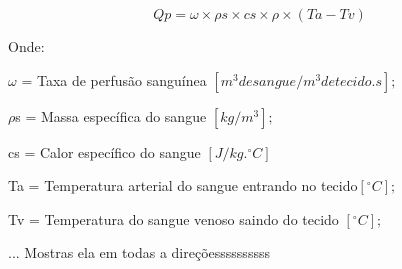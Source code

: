     \begin{equation} Qp= \omega\times\rho s\times cs\times\rho\times(Ta-Tv) \end{equation}

       Onde:

       $\omega$ = Taxa de perfusão sanguínea $[m^3 de sangue/m^3 de tecido.s];$

      $ \rho$s = Massa específica do sangue $[kg/m^3];$

        cs = Calor específico do sangue  $[J/kg.^{\circ}C]$

        Ta = Temperatura arterial do sangue entrando no tecido$ [^{\circ}C];$

      Tv = Temperatura do sangue venoso saindo do tecido $[^{\circ}C];$


... Mostras ela em todas a direçõessssssssss






           
              